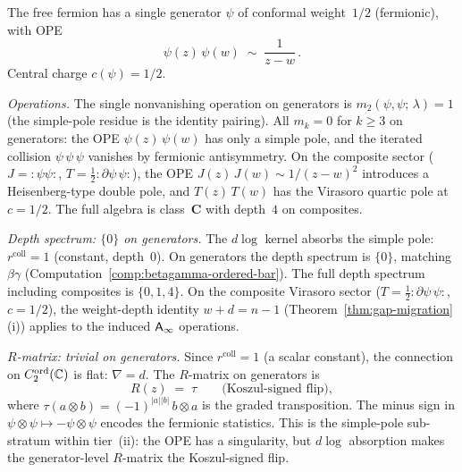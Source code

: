 \begin{computation}%
\label{comp:free-fermion-ordered-bar}%
%
%
%
The free fermion has a single generator $\psi$ of conformal
weight~$1/2$ (fermionic), with OPE
\begin{equation}\label{eq:free-fermion-ope}
\psi(z)\,\psi(w) \;\sim\; \frac{1}{z-w}\,.
\end{equation}
Central charge $c(\psi) = 1/2$.

\smallskip
\noindent
\emph{Operations.}
The single nonvanishing operation on generators is
$m_2(\psi,\psi;\,\lambda) = 1$
(the simple-pole residue is the identity pairing).
All $m_k = 0$ for $k \ge 3$ on generators: the OPE
$\psi(z)\,\psi(w)$ has only a simple pole, and the
iterated collision $\psi\,\psi\,\psi$ vanishes by
fermionic antisymmetry. On the composite sector
($J = {:}\psi\psi{:}$, $T = \tfrac{1}{2}{:}\partial\psi\,\psi{:}$),
the OPE $J(z)\,J(w) \sim 1/(z-w)^2$ introduces a
Heisenberg-type double pole, and $T(z)\,T(w)$ has the
Virasoro quartic pole at $c = 1/2$. The full algebra is
class~$\mathbf{C}$ with depth~$4$ on composites.

\smallskip
\noindent
\emph{Depth spectrum: $\{0\}$ on generators.}
The $d\log$ kernel absorbs the simple pole:
$r^{\mathrm{coll}} = 1$ (constant, depth~$0$).
On generators the depth spectrum is $\{0\}$, matching
$\beta\gamma$ (Computation~\ref{comp:betagamma-ordered-bar}).
The full depth spectrum including composites is $\{0,1,4\}$.
On the composite Virasoro sector ($T = \tfrac{1}{2}{:}\partial\psi\,\psi{:}$, $c = 1/2$), the weight-depth identity $w + d = n - 1$ (Theorem~\ref{thm:gap-migration}(i)) applies to the induced $\mathsf{A}_{\infty}$ operations.

\smallskip
\noindent
\emph{$R$-matrix: trivial on generators.}
Since $r^{\mathrm{coll}} = 1$ (a scalar constant), the connection
on $C_2^{\mathrm{ord}}(\mathbb{C})$ is flat: $\nabla = d$.
The $R$-matrix on generators is
\begin{equation}\label{eq:free-fermion-R}
R(z) \;=\; \tau \qquad\text{(Koszul-signed flip)},
\end{equation}
where $\tau(a \otimes b) = (-1)^{|a||b|}\,b \otimes a$ is the
graded transposition. The minus sign in
$\psi \otimes \psi \mapsto -\psi \otimes \psi$
encodes the fermionic statistics. This is the simple-pole
sub-stratum within tier~(ii): the OPE has a singularity,
but $d\log$ absorption makes the generator-level
$R$-matrix the Koszul-signed flip.


\end{computation}
